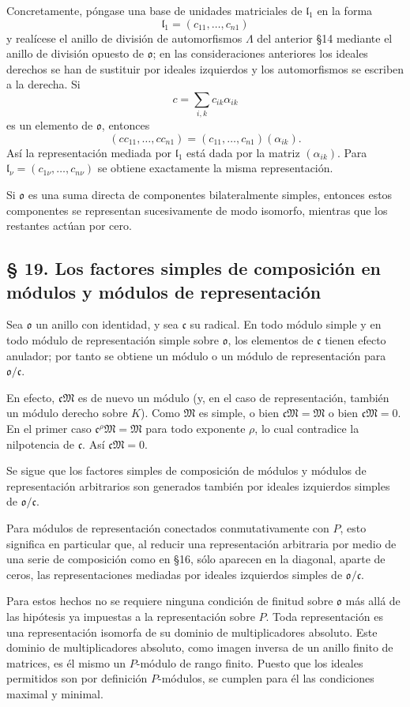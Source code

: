 \documentclass[11pt]{article}
\providecommand{\mM}{\mathfrak{M}}
\providecommand{\mo}{\mathfrak{o}}
\providecommand{\mc}{\mathfrak{c}}
\providecommand{\ml}{\mathfrak{l}}
\begin{document}
Concretamente, póngase una base de unidades matriciales de $\ml_1$ en la forma
\[
        \ml_1=(c_{11},\ldots,c_{n1})
\]
y realícese el anillo de división de automorfismos $\Lambda$ del anterior §14 mediante el anillo de división opuesto de $\mo$; en las consideraciones anteriores los ideales derechos se han de sustituir por ideales izquierdos y los automorfismos se escriben a la derecha. Si
\[
        c=\sum_{i,k}c_{ik}\alpha_{ik}
\]
es un elemento de $\mo$, entonces
\[
        (cc_{11},\ldots,cc_{n1})=(c_{11},\ldots,c_{n1})(\alpha_{ik}).
\]
Así la representación mediada por $\ml_1$ está dada por la matriz $(\alpha_{ik})$. Para $\ml_\nu=(c_{1\nu},\ldots,c_{n\nu})$ se obtiene exactamente la misma representación.

Si $\mo$ es una suma directa de componentes bilateralmente simples, entonces estos componentes se representan sucesivamente de modo isomorfo, mientras que los restantes actúan por cero.

\subsection*{§ 19. Los factores simples de composición en módulos y módulos de representación}

Sea $\mo$ un anillo con identidad, y sea $\mc$ su radical. En todo módulo simple y en todo módulo de representación simple sobre $\mo$, los elementos de $\mc$ tienen efecto anulador; por tanto se obtiene un módulo o un módulo de representación para $\mo/\mc$.

En efecto, $\mc\mM$ es de nuevo un módulo (y, en el caso de representación, también un módulo derecho sobre $K$). Como $\mM$ es simple, o bien $\mc\mM=\mM$ o bien $\mc\mM=0$. En el primer caso $\mc^\rho\mM=\mM$ para todo exponente $\rho$, lo cual contradice la nilpotencia de $\mc$. Así $\mc\mM=0$.

Se sigue que los factores simples de composición de módulos y módulos de representación arbitrarios son generados también por ideales izquierdos simples de $\mo/\mc$.

Para módulos de representación conectados conmutativamente con $P$, esto significa en particular que, al reducir una representación arbitraria por medio de una serie de composición como en §16, sólo aparecen en la diagonal, aparte de ceros, las representaciones mediadas por ideales izquierdos simples de $\mo/\mc$.

Para estos hechos no se requiere ninguna condición de finitud sobre $\mo$ más allá de las hipótesis ya impuestas a la representación sobre $P$. Toda representación es una representación isomorfa de su dominio de multiplicadores absoluto. Este dominio de multiplicadores absoluto, como imagen inversa de un anillo finito de matrices, es él mismo un $P$-módulo de rango finito. Puesto que los ideales permitidos son por definición $P$-módulos, se cumplen para él las condiciones maximal y minimal.
\end{document}
